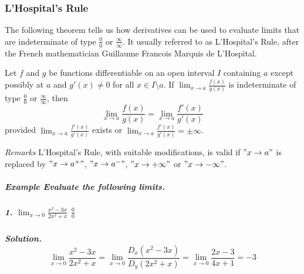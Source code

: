 \documentclass[
  letterpaper,
  DIV=11,
  numbers=noendperiod]{scrartcl}
\let\oldsubparagraph\subparagraph
\renewcommand{\subparagraph}[1]{\oldsubparagraph{#1}\mbox{}}
\theoremstyle{plain}
\theoremstyle{remark}
\begin{document}
\hypertarget{htm:lhospitalsrule}{}
\hypertarget{lhospitals-rule}{%
\subsubsection{L'Hospital's Rule}\label{lhospitals-rule}}

The following theorem tells us how derivatives can be used to evaluate
limits that are indeterminate of type \(\frac{0}{0}\) or
\(\frac{\infty}{\infty}\). It usually referred to as L'Hospital's Rule,
after the French mathematician Guillaume Francois Marquis de L'Hospital.

\leavevmode{}%
Let \(f\) and \(g\) be functions differentiable on an open interval
\(I\) containing \(a\) except possibly at \(a\) and \(g'(x)\ne 0\) for
all \(x \in I \setminus {a}\). If
\(\displaystyle\lim_{x \to a}\frac{f(x)}{g(x)}\) is indeterminate of
type \(\frac{0}{0}\) or \(\frac{\infty}{\infty}\), then \[
\displaystyle\lim_{x \to a}\frac{f(x)}{g(x)}=\displaystyle\lim_{x \to a}\frac{f'(x)}{g'(x)}
\] provided \(\displaystyle\lim_{x \to a}\frac{f'(x)}{g'(x)}\) exists or
\(\displaystyle\lim_{x \to a}\frac{f'(x)}{g'(x)}=\pm \infty\).

\leavevmode{}%
\emph{Remarks} L'Hospital's Rule, with suitable modifications, is valid
if \("x \to a"\) is replaced by \("x \to a^+"\), \("x \to a^-"\),
\("x \to +\infty"\) or \("x \to -\infty"\).

\hypertarget{exm:remarks}{}
\hypertarget{example-evaluate-the-following-limits.}{%
\subparagraph{\texorpdfstring{\emph{Example} Evaluate the following
limits.}{Example Evaluate the following limits.}}\label{example-evaluate-the-following-limits.}}

\hypertarget{displaystylelim_x-to-0-fracx2-3x2x2x-frac00}{%
\subparagraph{\texorpdfstring{1.
\(\displaystyle\lim_{x \to 0} \frac{x^2-3x}{2x^2+x}\)
\(\frac{0}{0}\)}{1. \textbackslash displaystyle\textbackslash lim\_\{x \textbackslash to 0\} \textbackslash frac\{x\^{}2-3x\}\{2x\^{}2+x\} \textbackslash frac\{0\}\{0\}}}\label{displaystylelim_x-to-0-fracx2-3x2x2x-frac00}}

\hypertarget{solution.-displaystylelim_x-to-0-fracx2-3x2x2xdisplaystylelim_x-to-0-fracd_xleftx2-3xrightd_yleft2x2xrightdisplaystylelim_x-to-0-frac2x-34x1-3}{%
\subparagraph{\texorpdfstring{\emph{Solution}. \[
\displaystyle\lim_{x \to 0} \frac{x^2-3x}{2x^2+x}=\displaystyle\lim_{x \to 0} \frac{D_x\left(x^2-3x\right)}{D_y\left(2x^2+x\right)}=\displaystyle\lim_{x \to 0} \frac{2x-3}{4x+1}=-3
\]}{Solution. 
\textbackslash displaystyle\textbackslash lim\_\{x \textbackslash to 0\} \textbackslash frac\{x\^{}2-3x\}\{2x\^{}2+x\}=\textbackslash displaystyle\textbackslash lim\_\{x \textbackslash to 0\} \textbackslash frac\{D\_x\textbackslash left(x\^{}2-3x\textbackslash right)\}\{D\_y\textbackslash left(2x\^{}2+x\textbackslash right)\}=\textbackslash displaystyle\textbackslash lim\_\{x \textbackslash to 0\} \textbackslash frac\{2x-3\}\{4x+1\}=-3
}}\label{solution.-displaystylelim_x-to-0-fracx2-3x2x2xdisplaystylelim_x-to-0-fracd_xleftx2-3xrightd_yleft2x2xrightdisplaystylelim_x-to-0-frac2x-34x1-3}}
\end{document}
